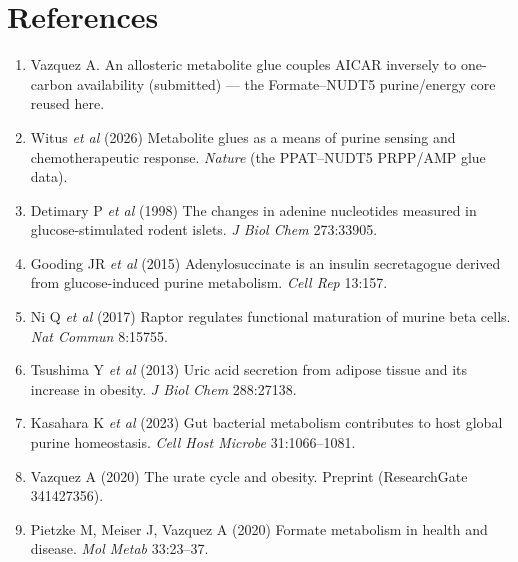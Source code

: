 \documentclass[11pt]{article}
\begin{document}
\section*{References}
\small
\begin{enumerate}\itemsep1pt
  \item Vazquez A. An allosteric metabolite glue couples AICAR inversely to
  one-carbon availability (submitted) --- the Formate--NUDT5 purine/energy core
  reused here.
  \item Witus \textit{et al} (2026) Metabolite glues as a means of purine sensing
  and chemotherapeutic response. \textit{Nature} (the PPAT--NUDT5 PRPP/AMP glue
  data).
  \item Detimary P \textit{et al} (1998) The changes in adenine nucleotides
  measured in glucose-stimulated rodent islets. \textit{J Biol Chem} 273:33905.
  \item Gooding JR \textit{et al} (2015) Adenylosuccinate is an insulin
  secretagogue derived from glucose-induced purine metabolism. \textit{Cell Rep}
  13:157.
  \item Ni Q \textit{et al} (2017) Raptor regulates functional maturation of
  murine beta cells. \textit{Nat Commun} 8:15755.
  \item Tsushima Y \textit{et al} (2013) Uric acid secretion from adipose tissue
  and its increase in obesity. \textit{J Biol Chem} 288:27138.
  \item Kasahara K \textit{et al} (2023) Gut bacterial metabolism contributes to
  host global purine homeostasis. \textit{Cell Host Microbe} 31:1066--1081.
  \item Vazquez A (2020) The urate cycle and obesity. Preprint
  (ResearchGate 341427356).
  \item Pietzke M, Meiser J, Vazquez A (2020) Formate metabolism in health and
  disease. \textit{Mol Metab} 33:23--37.
\end{enumerate}
\end{document}
